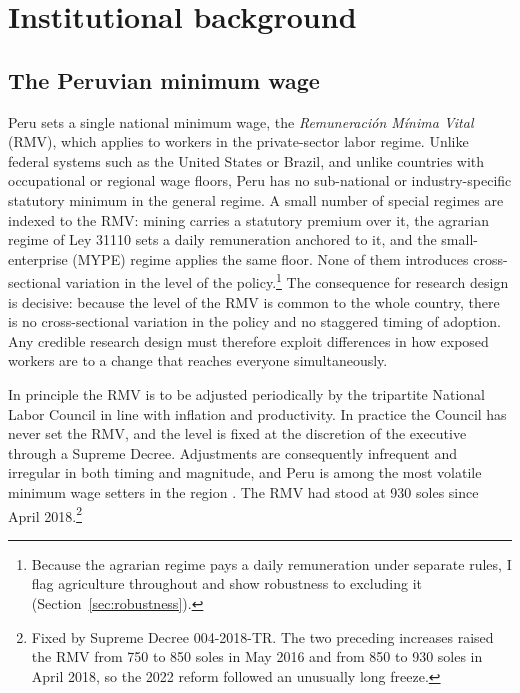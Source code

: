 \section{Institutional background}\label{sec:institutional}

\subsection{The Peruvian minimum wage}

Peru sets a single national minimum wage, the \emph{Remuneración Mínima Vital} (RMV), which applies to workers in the private-sector labor regime. Unlike federal systems such as the United States or Brazil, and unlike countries with occupational or regional wage floors, Peru has no sub-national or industry-specific statutory minimum in the general regime. A small number of special regimes are indexed to the RMV: mining carries a statutory premium over it, the agrarian regime of Ley 31110 sets a daily remuneration anchored to it, and the small-enterprise (MYPE) regime applies the same floor. None of them introduces cross-sectional variation in the level of the policy.\footnote{Because the agrarian regime pays a daily remuneration under separate rules, I flag agriculture throughout and show robustness to excluding it (Section~\ref{sec:robustness}).} The consequence for research design is decisive: because the level of the RMV is common to the whole country, there is no cross-sectional variation in the policy and no staggered timing of adoption. Any credible research design must therefore exploit differences in how exposed workers are to a change that reaches everyone simultaneously.

In principle the RMV is to be adjusted periodically by the tripartite National Labor Council in line with inflation and productivity. In practice the Council has never set the RMV, and the level is fixed at the discretion of the executive through a Supreme Decree. Adjustments are consequently infrequent and irregular in both timing and magnitude, and Peru is among the most volatile minimum wage setters in the region \citep{jimenez_2023, cespedes_2005}. The RMV had stood at 930 soles since April 2018.\footnote{Fixed by Supreme Decree 004-2018-TR. The two preceding increases raised the RMV from 750 to 850 soles in May 2016 and from 850 to 930 soles in April 2018, so the 2022 reform followed an unusually long freeze.}

